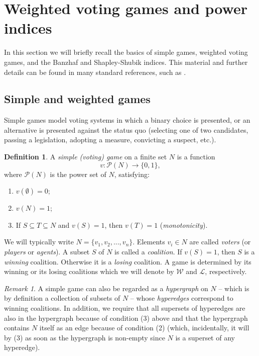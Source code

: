 \documentclass[11pt]{amsart}
\theoremstyle{plain}
\theoremstyle{definition}
\newtheorem{defin}[thm]{Definition}
\theoremstyle{remark}
\newtheorem{rem}[thm]{Remark}
\begin{document}

\section{Weighted voting games and power indices}\label{S:WeightedGames}

In this section we will briefly recall the basics of simple games, weighted voting games, and the Banzhaf and Shapley-Shubik indices. This material and further details can be found in many standard references, such as  \cite{FM:VotingPower, FM:Misreinvention, LV:VotingDecisions, Napel:VotingPower, TP:MathPolitics, TZ:SimpleGames, W:ProbGames}. 


\subsection{Simple and weighted games}\label{SS:SimpleGames}


Simple games model voting systems in which a binary choice is presented, or an alternative is presented against the status quo (selecting one of two candidates, passing a legislation, adopting a measure, convicting a suspect, etc.). 


\begin{defin}\label{D:SimpleGame} A \emph{simple (voting) game} on a finite set $N$  is a function
$$
v\colon \mathcal P(N) \longrightarrow \{0,1\},
$$
where $\mathcal P(N)$ is the power set of $N$, satisfying:
\begin{enumerate}
\item $v(\emptyset)=0$;
\item $v(N)=1$;
\item If $S\subseteq T\subseteq N$ and $v(S)=1$, then $v(T)=1$ (\emph{monotonicity}). 
\end{enumerate}
\end{defin}

We will typically write $N=\{v_1, v_2, ..., v_n\}$. Elements $v_i\in N$ are called \emph{voters} (or \emph{players} or \emph{agents}). A subset $S$ of $N$ is called a \emph{coalition}. If $v(S)=1$, then $S$ is a \emph{winning} coalition. Otherwise it is a \emph{losing} coalition. A game is determined by its winning or its losing coalitions which we will denote by $\mathcal W$ and $\mathcal L$, respectively.

\begin{rem}\label{R:Hypergraph}
A simple game can also be regarded as a \emph{hypergraph} on $N$ -- which is by definition a collection of subsets of $N$ -- whose \emph{hyperedges} correspond to winning coalitions. In addition, we require that all supersets of hyperedges are also in the hypergraph because of condition (3) above and that the hypergraph contains $N$ itself as an edge because of condition (2) (which, incidentally, it will by (3) as soon as the hypergraph is non-empty since $N$ is a superset of any hyperedge). 
\end{rem}
\end{document}
